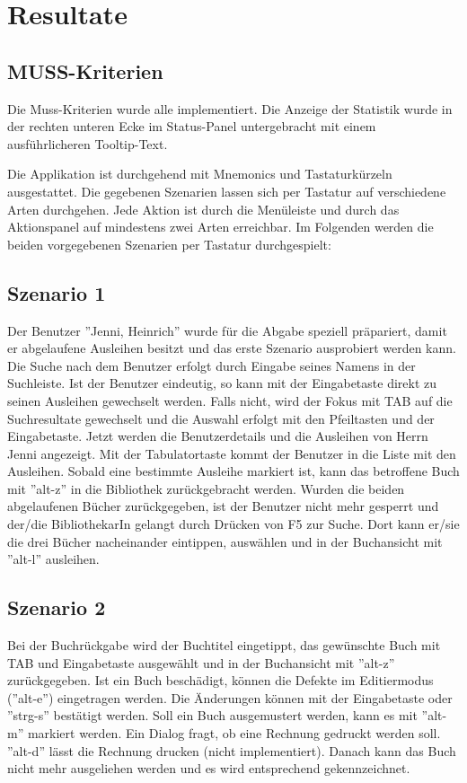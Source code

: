 \documentclass[10pt, a4paper]{scrartcl}
\begin{document}
\section{Resultate}
\subsection{MUSS-Kriterien}
Die Muss-Kriterien wurde alle implementiert. Die Anzeige der Statistik wurde in der rechten unteren Ecke im Status-Panel untergebracht mit einem ausführlicheren Tooltip-Text.

Die Applikation ist durchgehend mit Mnemonics und Tastaturkürzeln ausgestattet. Die gegebenen Szenarien lassen sich per Tastatur auf verschiedene Arten durchgehen. Jede Aktion ist durch die Menüleiste und durch das Aktionspanel auf mindestens zwei Arten erreichbar. Im Folgenden werden die beiden vorgegebenen Szenarien per Tastatur durchgespielt:

\subsection{Szenario 1} Der Benutzer ''Jenni, Heinrich'' wurde für die Abgabe speziell präpariert, damit er abgelaufene Ausleihen besitzt und das erste Szenario ausprobiert werden kann. Die Suche nach dem Benutzer erfolgt durch Eingabe seines Namens in der Suchleiste. Ist der Benutzer eindeutig, so kann mit der Eingabetaste direkt zu seinen Ausleihen gewechselt werden. Falls nicht, wird der Fokus mit TAB auf die Suchresultate gewechselt und die Auswahl erfolgt mit den Pfeiltasten und der Eingabetaste. Jetzt werden die Benutzerdetails und die Ausleihen von Herrn Jenni angezeigt. Mit der Tabulatortaste kommt der Benutzer in die Liste mit den Ausleihen. Sobald eine bestimmte Ausleihe markiert ist, kann das betroffene Buch mit ''alt-z'' in die Bibliothek zurückgebracht werden. Wurden die beiden abgelaufenen Bücher zurückgegeben, ist der Benutzer nicht mehr gesperrt und der/die BibliothekarIn gelangt durch Drücken von F5 zur Suche. Dort kann er/sie die drei Bücher nacheinander eintippen, auswählen und in der Buchansicht mit ''alt-l'' ausleihen.

\subsection{Szenario 2} Bei der Buchrückgabe wird der Buchtitel eingetippt, das gewünschte Buch mit TAB und Eingabetaste ausgewählt und in der Buchansicht mit ''alt-z'' zurückgegeben. Ist ein Buch beschädigt, können die Defekte im Editiermodus (''alt-e'') eingetragen werden. Die Änderungen können mit der Eingabetaste oder ''strg-s'' bestätigt werden. Soll ein Buch ausgemustert werden, kann es mit ''alt-m'' markiert werden. Ein Dialog fragt, ob eine Rechnung gedruckt werden soll. ''alt-d'' lässt die Rechnung drucken (nicht implementiert). Danach kann das Buch nicht mehr ausgeliehen werden und es wird entsprechend gekennzeichnet.
\end{document}
